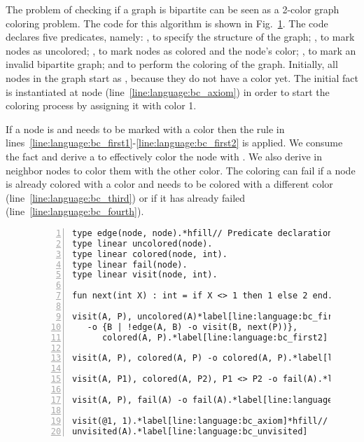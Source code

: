 The problem of checking if a graph is bipartite can be seen as a 2-color graph
coloring problem. The code for this algorithm is shown in
Fig.~\ref{language:code:bichecking}. The code declares five predicates, namely:
, to specify the structure of the graph; , to mark
nodes as uncolored; , to mark nodes as colored and the node's
color; , to mark an invalid bipartite graph; and  to
perform the coloring of the graph.  Initially, all nodes in the graph start as
, because they do not have a color yet. The initial fact
 is instantiated at node 
(line~\ref{line:language:bc_axiom}) in order to start the coloring process by
assigning it with color 1.

If a node is  and needs to be marked with a color  then
the rule in lines~\ref{line:language:bc_first1}-\ref{line:language:bc_first2} is
applied. We consume the  fact and derive a 
to effectively color the node with . We also derive  in neighbor nodes to color them with the other color.  The coloring
can fail if a node is already colored with a color  and needs to be
colored with a different color (line~\ref{line:language:bc_third}) or if it has
already failed (line~\ref{line:language:bc_fourth}).

\begin{figure}[h!]
\begin{Verbatim}[numbers=left,fontsize=\codesize,commandchars=\*\[\]]
type edge(node, node).*hfill// Predicate declaration
type linear uncolored(node).
type linear colored(node, int).
type linear fail(node).
type linear visit(node, int).

fun next(int X) : int = if X <> 1 then 1 else 2 end.*hfill// Function declaration

visit(A, P), uncolored(A)*label[line:language:bc_first1]*hfill// Rule 1: coloring a node
   -o {B | !edge(A, B) -o visit(B, next(P))},
      colored(A, P).*label[line:language:bc_first2]

visit(A, P), colored(A, P) -o colored(A, P).*label[line:language:bc_second]*hfill// Rule 2: node is already colored

visit(A, P1), colored(A, P2), P1 <> P2 -o fail(A).*label[line:language:bc_third]*hfill// Rule 3: graph is not bipartite

visit(A, P), fail(A) -o fail(A).*label[line:language:bc_fourth]*hfill// Rule 4: graph is still not bipartite

visit(@1, 1).*label[line:language:bc_axiom]*hfill// Initial facts
unvisited(A).*label[line:language:bc_unvisited]
\end{Verbatim}
  \label{language:code:bichecking}
\end{figure}

